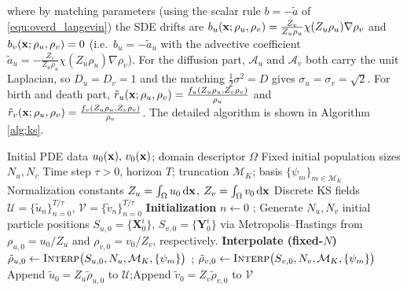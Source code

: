 \documentclass[a4paper,fleqn]{cas-sc}
\theoremstyle{definition}
\theoremstyle{remark}
\begin{document}
where by matching parameters (using the scalar rule $b=-\tilde a$ of \eqref{equ:overd_langevin}) the SDE drifts are $b_u(\mathbf{x};\rho_u,\rho_v) = \frac{Z_v}{Z_u\rho_u} \chi(Z_u\rho_u) \nabla \rho_v$ and $b_v(\mathbf{x};\rho_u,\rho_v)= 0$ (i.e.\ $b_u=-\tilde a_u$ with the advective coefficient $\tilde a_u=-\frac{Z_v}{Z_u\rho_u}\chi(Z_u\rho_u)\nabla\rho_v$). For the diffusion part, $\mathcal A_u$ and $\mathcal A_v$ both carry the unit Laplacian, so $D_u=D_v=1$ and the matching $\tfrac12\sigma^2=D$ gives $\sigma_u=\sigma_v=\sqrt2$. For birth and death part, $\tilde r_u (\mathbf{x};\rho_u,\rho_v)=  \frac{f_u(Z_u\rho_u,Z_v \rho_v)}{\rho_u}  $ and $\tilde r_v (\mathbf{x};\rho_u,\rho_v )=  \frac{f_v(Z_u\rho_u,Z_v \rho_v)}{\rho_v}  $. The detailed algorithm is shown in  Algorithm \ref{alg:ks}.

\begin{algorithm}
\caption{Stochastic Branching for keller--Segel equation}\label{alg:ks}
\begin{algorithmic}
\Require Initial PDE data $u_0(\mathbf{x}),\,v_0(\mathbf{x})$; domain descriptor $\Omega$
\Require Fixed initial population sizes $N_u, N_v$
\Require Time step $\tau>0$, horizon $T$; truncation $\mathcal M_K$; basis $\{\psi_m\}_{m\in\mathcal M_K}$
\Require Normalization constants $Z_u=\int_\Omega u_0\,\mathrm d\mathbf{x}$, $Z_v=\int_\Omega v_0\,\mathrm d\mathbf{x}$
\Ensure Discrete KS fields $\mathcal U=\{\tilde u_n\}_{n=0}^{T/\tau}$, $\mathcal V=\{\tilde v_n\}_{n=0}^{T/\tau}$
  \State \textbf{Initialization}
  \State $n\gets 0$
  ; Generate $N_u,N_v$ initial particle positions $S_{u,0}=\{\mathbf X^i_0\}$, $S_{v,0}=\{\mathbf Y^i_0\}$ via Metropolis--Hastings from $\rho_{u,0}=u_0/Z_u$ and $\rho_{v,0}=v_0/Z_v$, respectively.
  \State \textbf{Interpolate (fixed-$N$)}
  \State $\tilde\rho_{u,0} \gets \textsc{Interp}\big(S_{u,0},N_u,\mathcal M_K,\{\psi_m\}\big)$
  ; $\tilde\rho_{v,0} \gets \textsc{Interp}\big(S_{v,0},N_v,\mathcal M_K,\{\psi_m\}\big)$
  \State Append $\tilde u_0 = Z_u \tilde\rho_{u,0}$ to $\mathcal U$;\quad Append $\tilde v_0 = Z_v \tilde\rho_{v,0}$ to $\mathcal V$

\end{algorithmic}
\end{algorithm}
\end{document}
